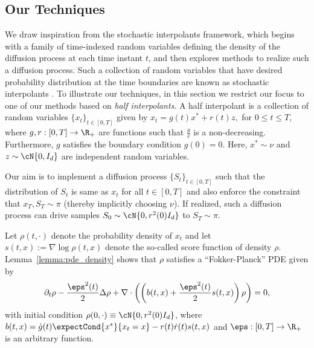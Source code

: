 
\subsection{Our Techniques}
We draw inspiration from the stochastic interpolants framework, which begins with a family of time-indexed random variables defining the density of the diffusion process at each time instant $t$, and then explores methods to realize such a diffusion process. Such a collection of random variables that have desired probability distribution at the time boundaries are known as stochastic interpolants \cite{albergo_stochastic_2023}. 
To illustrate our techniques, in this section we restrict our focus to one of our methods based on \textit{half interpolants}. 
A half interpolant is a collection of random variables $\{x_t\}_{t\in[0,T]}$ given by $x_t = g(t)x^*+r(t)z,$ for $0\le t\le T$, where $g,r:[0,T]\rightarrow \R_+$ are functions such that $\frac{g}{r}$ is a non-decreasing. Furthermore, $g$ satisfies the boundary condition $g(0)=0$. Here, $x^*\sim\nu$ and $z\sim\cN{0,I_d}$ are independent random variables.

 Our aim is to implement a diffusion process $\{S_t\}_{t\in[0,T]}$ such that the distribution of $S_t$ is same as $x_t$ for all $t\in[0,T]$ and also enforce the constraint that $x_T,S_T\sim\pi$ (thereby implicitly choosing $\nu$). If realized, such a diffusion process can drive samples $S_0\sim\cN{0,r^2(0)I_d}$ to $S_T\sim\pi$. 
 
 Let $\rho(t,\cdot)$ denote the probability density of $x_t$ and let $s(t,x) := \nabla\log{\rho(t,x)}$ denote the so-called score function of density $\rho$. Lemma~\ref{lemma:pde_density} shows that $\rho$ satisfies a ``Fokker-Planck'' PDE given by
\begin{equation}\label{eqn:FPE_tech}
    \partial_t\rho-\frac{\eps^2(t)}{2}\Delta\rho+\nabla\cdot\left(\left(b(t,x)+\frac{\eps^2(t)}{2}s(t,x)\right)\rho\right) = 0,%
\end{equation}
with initial condition $\rho(0,\cdot) \equiv \cN{0,r^2(0)I_d}$, where $b(t,x) = \dot g(t)\expectCond{x^*}{x_t=x}-r(t)\dot r(t)s(t,x)$ and $\eps:[0,T]\rightarrow \R_+$ is an arbitrary function.

